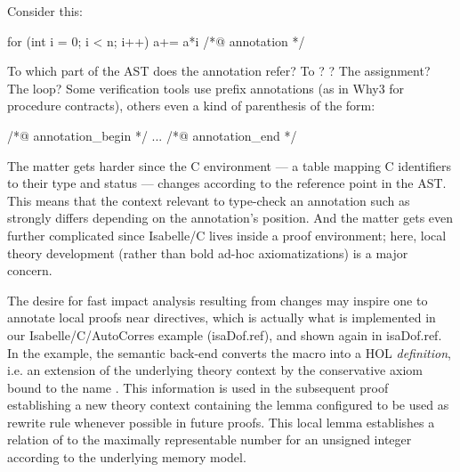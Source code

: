 \begin{isabellebody}
\begin{isamarkuptext}
Consider this:
\begin{isar}
     for (int i = 0; i < n; i++) a+= a*i /*@ annotation */
\end{isar}
To which part of the AST does the annotation refer? To ? ? The
assignment? The loop? Some verification tools use prefix annotations (as in Why3 for procedure
contracts), others even a kind of parenthesis of the form:
\begin{isar}
     /*@ annotation_begin */ ...  /*@ annotation_end */
\end{isar}
The matter gets harder since the C environment --- a table mapping C identifiers to their type and
status --- changes according to the reference point in the AST. This means that the context relevant
to type-check an annotation such as  strongly
differs depending on the annotation's position. And the matter gets even further complicated since
Isabelle/C lives inside a proof environment; here, local theory development (rather than bold ad-hoc
axiomatizations) is a major concern.

The desire for fast impact analysis resulting from changes may inspire one to annotate local proofs
near directives, which is actually what is implemented in our Isabelle/C/AutoCorres example
(\csname isaDof.ref), and shown again in \csname isaDof.ref. In the example, the semantic back-end converts the
 macro into a HOL \emph{definition}, i.e. an extension
of the underlying theory context by the conservative axiom
 bound to the name
. This information is used in the subsequent proof
establishing a new theory context containing the lemma 
configured to be used as rewrite rule whenever possible in future proofs. This local lemma
establishes a relation of  to the maximally representable number
 for an unsigned integer according to the underlying memory model.


\end{isamarkuptext}
\end{isabellebody}
